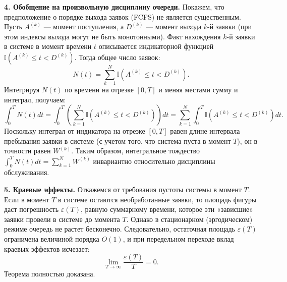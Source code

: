 \begin{tproof}
\textbf{4. Обобщение на произвольную дисциплину очереди.}
Покажем, что предположение о порядке выхода заявок (FCFS) не является существенным. Пусть $A^{(k)}$ — момент поступления, а $D^{(k)}$ — момент выхода $k$-й заявки (при этом индексы выхода могут не быть монотонными). Факт нахождения $k$-й заявки в системе в момент времени $t$ описывается индикаторной функцией $\mathbb{I}(A^{(k)} \le t < D^{(k)})$. Тогда общее число заявок:
$$ N(t) = \sum_{k=1}^{N} \mathbb{I}(A^{(k)} \le t < D^{(k)}). $$
Интегрируя $N(t)$ по времени на отрезке $[0, T]$ и меняя местами сумму и интеграл, получаем:
$$ \int_{0}^{T} N(t) dt = \int_{0}^{T} \left( \sum_{k=1}^{N} \mathbb{I}(A^{(k)} \le t < D^{(k)}) \right) dt = \sum_{k=1}^{N} \int_{0}^{T} \mathbb{I}(A^{(k)} \le t < D^{(k)}) dt. $$
Поскольку интеграл от индикатора на отрезке $[0, T]$ равен длине интервала пребывания заявки в системе (с учетом того, что система пуста в момент $T$), он в точности равен $W^{(k)}$. Таким образом, интегральное тождество $\int_0^T N(t) dt = \sum_{k=1}^N W^{(k)}$ инвариантно относительно дисциплины обслуживания.

\textbf{5. Краевые эффекты.}
Откажемся от требования пустоты системы в момент $T$. Если в момент $T$ в системе остаются необработанные заявки, то площадь фигуры даст погрешность $\varepsilon(T)$, равную суммарному времени, которое эти «зависшие» заявки провели в системе до момента $T$. Однако в стационарном (эргодическом) режиме очередь не растет бесконечно. Следовательно, остаточная площадь $\varepsilon(T)$ ограничена величиной порядка $O(1)$, и при передельном переходе вклад краевых эффектов исчезает:
$$ \lim_{T \to \infty} \frac{\varepsilon(T)}{T} = 0. $$
Теорема полностью доказана.
\end{tproof}